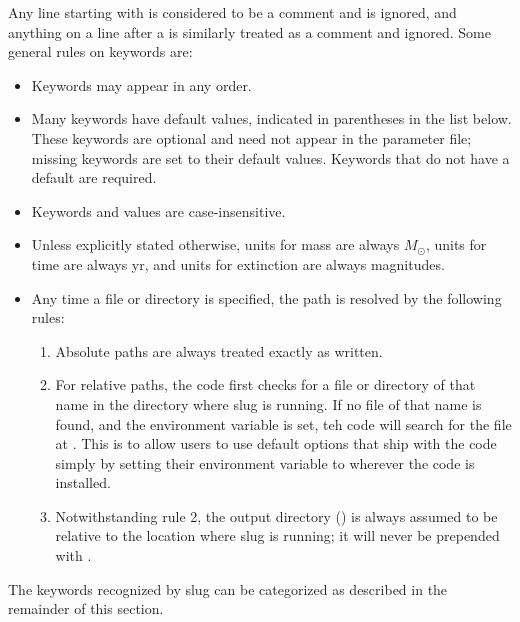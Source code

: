 \documentclass[letterpaper,10pt,english]{sphinxmanual}
\begin{document}
Any line starting with \sphinxcode{\#} is considered to be a comment and is ignored, and anything on a line after a \sphinxcode{\#} is similarly treated as a comment and ignored. Some general rules on keywords are:
\begin{itemize}
\item {} 
Keywords may appear in any order.

\item {} 
Many keywords have default values, indicated in parentheses in the
list below. These keywords are optional and need not appear in the
parameter file; missing keywords are set to their default values.
Keywords that do not have a default are required.

\item {} 
Keywords and values are case-insensitive.

\item {} 
Unless explicitly stated otherwise, units for mass are always
\(M_\odot\), units for time are always yr, and units for
extinction are always magnitudes.

\item {} 
Any time a file or directory is specified, the path is resolved by
the following rules:
\begin{enumerate}
\item {} 
Absolute paths are always treated exactly as written.

\item {} 
For relative paths, the code first checks for a file or directory
of that name in the directory where slug is running. If no file
of that name is found, and the environment variable 
is set, teh code will search for the file at
. This is to allow users to
use default options that ship with the code simply by setting
their  environment variable to wherever the code is
installed.

\item {} 
Notwithstanding rule 2, the output directory () is
always assumed to be relative to the location where slug is
running; it will never be prepended with .

\end{enumerate}

\end{itemize}

The keywords recognized by slug can be categorized as described in the remainder of this section.
\end{document}
